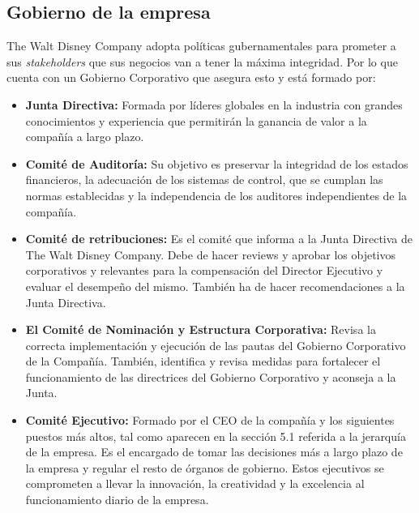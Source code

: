 \subsection{Gobierno de la empresa}
The Walt Disney Company adopta políticas gubernamentales para prometer a sus \textit{stakeholders} que sus negocios van a tener la máxima integridad. Por lo que cuenta con un Gobierno Corporativo que asegura esto y está formado por:

\begin{itemize}

\item
\textbf{Junta Directiva:} Formada por líderes globales en la industria con grandes conocimientos y experiencia que permitirán la ganancia de valor a la compañía a largo plazo.

\item
\textbf{Comité de Auditoría:} Su objetivo es preservar la integridad de los estados financieros, la adecuación de los sistemas de control, que se cumplan las normas establecidas y la independencia de los auditores independientes de la compañía.

\item
\textbf{Comité de retribuciones:} Es el comité que informa a la Junta Directiva de The Walt Disney Company. Debe de hacer reviews y aprobar los objetivos corporativos y relevantes para la compensación del Director Ejecutivo y evaluar el desempeño del mismo. También ha de hacer recomendaciones a la Junta Directiva.

\item
\textbf{El Comité de Nominación y Estructura Corporativa:} Revisa la correcta implementación y ejecución de las pautas del Gobierno Corporativo de la Compañía. También, identifica y revisa medidas para fortalecer el funcionamiento de las directrices del Gobierno Corporativo y aconseja a la Junta.

\item
\textbf{Comité Ejecutivo:} Formado por el CEO de la compañía y los siguientes puestos más altos, tal como aparecen en la sección 5.1 referida a la jerarquía de la empresa. Es el encargado de tomar las decisiones más a largo plazo de la empresa y regular el resto de órganos de gobierno. Estos ejecutivos se comprometen a llevar la innovación, la creatividad y la excelencia al funcionamiento diario de la empresa.

\end{itemize}